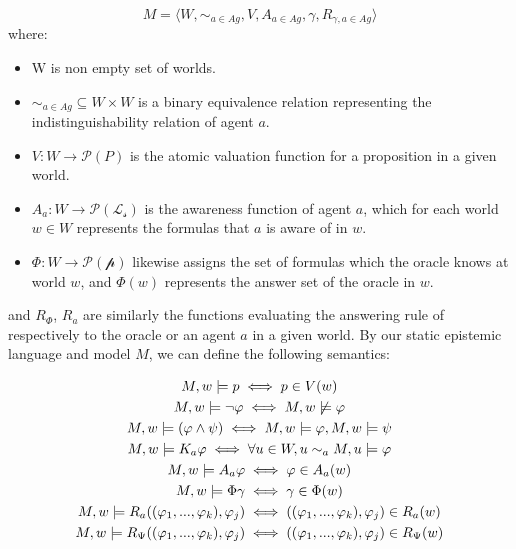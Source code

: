 $$
	M = \langle W, \sim_{a\in Ag}, V, A_{a\in Ag}, \gamma, R_{\gamma,a\in Ag}\rangle
$$
where: 
\begin{itemize}
	\setlength\itemsep{-0.4em}
	\item W is non empty set of worlds.
	\item $\sim_{a\in Ag} \subseteq W \times W$ is a binary equivalence relation representing the indistinguishability relation of agent $a$. 
	\item $V : W \rightarrow \mathscr{P}(P)$ is the atomic valuation function for a proposition in a given world.
	\item $A_a : W \rightarrow \mathscr{P}(\mathscr{L_s})$ is the awareness function of agent $a$, which for each world $w \in W$ represents the formulas that $a$ is aware of in $w$.
	\item $\Phi : W \rightarrow \mathscr{P}(\mathscr{p}) $ likewise assigns the set of formulas which the oracle knows at world $w$, and $\Phi(w)$ represents the answer set of the oracle in $w$.
\end{itemize}
and $R_{\Phi}$, $R_{a}$ are similarly the functions evaluating the answering rule of respectively to the oracle or an agent $a$ in a given world. By our static epistemic language \staticlang and model $M$, we can define the following semantics:

\begin{gather*}
	M, w |= p \iff p \in V(w) \\
	M, w |= \neg\varphi \iff M, w \not\models \varphi\\
	M, w |= (\varphi \land \psi) \iff M, w |= \varphi, M, w |= \psi \\
	M, w |= K_a\varphi \iff \forall u\in W, u \sim_{a} M, u |= \varphi \\
	M, w |= A_a\varphi \iff \varphi \in A_a(w) \\
	M, w |= \Phi\gamma \iff \gamma \in \Phi(w) \\
	M, w |= R_a((\varphi_1,...,\varphi_k), \varphi_j) \iff ((\varphi_1,...,\varphi_k), \varphi_j) \in R_a(w) \\
	M, w |= R_\Psi((\varphi_1,...,\varphi_k), \varphi_j) \iff ((\varphi_1,...,\varphi_k), \varphi_j) \in R_\Psi(w)
\end{gather*}

